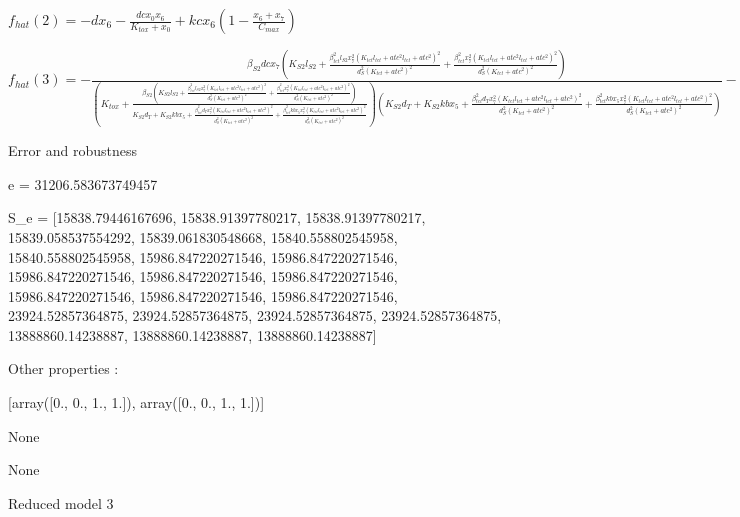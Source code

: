 $f_{hat}(2)=- d x_{6} - \frac{dc x_{0} x_{6}}{K_{tox} + x_{0}} + kc x_{6} \left(1 - \frac{x_{6} + x_{7}}{C_{max}}\right)$


$f_{hat}(3)=- \frac{\beta_{S2} dc x_{7} \left(K_{S2} l_{S2} + \frac{\beta_{tet}^{2} l_{S2} x_{7}^{2} \left(K_{tet} l_{tet} + atc^{2} l_{tet} + atc^{2}\right)^{2}}{d_{S}^{2} \left(K_{tet} + atc^{2}\right)^{2}} + \frac{\beta_{tet}^{2} x_{7}^{2} \left(K_{tet} l_{tet} + atc^{2} l_{tet} + atc^{2}\right)^{2}}{d_{S}^{2} \left(K_{tet} + atc^{2}\right)^{2}}\right)}{\left(K_{tox} + \frac{\beta_{S2} \left(K_{S2} l_{S2} + \frac{\beta_{tet}^{2} l_{S2} x_{7}^{2} \left(K_{tet} l_{tet} + atc^{2} l_{tet} + atc^{2}\right)^{2}}{d_{S}^{2} \left(K_{tet} + atc^{2}\right)^{2}} + \frac{\beta_{tet}^{2} x_{7}^{2} \left(K_{tet} l_{tet} + atc^{2} l_{tet} + atc^{2}\right)^{2}}{d_{S}^{2} \left(K_{tet} + atc^{2}\right)^{2}}\right)}{K_{S2} d_{T} + K_{S2} kb x_{5} + \frac{\beta_{tet}^{2} d_{T} x_{7}^{2} \left(K_{tet} l_{tet} + atc^{2} l_{tet} + atc^{2}\right)^{2}}{d_{S}^{2} \left(K_{tet} + atc^{2}\right)^{2}} + \frac{\beta_{tet}^{2} kb x_{5} x_{7}^{2} \left(K_{tet} l_{tet} + atc^{2} l_{tet} + atc^{2}\right)^{2}}{d_{S}^{2} \left(K_{tet} + atc^{2}\right)^{2}}}\right) \left(K_{S2} d_{T} + K_{S2} kb x_{5} + \frac{\beta_{tet}^{2} d_{T} x_{7}^{2} \left(K_{tet} l_{tet} + atc^{2} l_{tet} + atc^{2}\right)^{2}}{d_{S}^{2} \left(K_{tet} + atc^{2}\right)^{2}} + \frac{\beta_{tet}^{2} kb x_{5} x_{7}^{2} \left(K_{tet} l_{tet} + atc^{2} l_{tet} + atc^{2}\right)^{2}}{d_{S}^{2} \left(K_{tet} + atc^{2}\right)^{2}}\right)} - d x_{7} + kc x_{7} \left(1 - \frac{x_{6} + x_{7}}{C_{max}}\right)$



Error and robustness 


e = 31206.583673749457

S_e = [15838.79446167696, 15838.91397780217, 15838.91397780217, 15839.058537554292, 15839.061830548668, 15840.558802545958, 15840.558802545958, 15986.847220271546, 15986.847220271546, 15986.847220271546, 15986.847220271546, 15986.847220271546, 15986.847220271546, 15986.847220271546, 15986.847220271546, 23924.52857364875, 23924.52857364875, 23924.52857364875, 23924.52857364875, 13888860.14238887, 13888860.14238887, 13888860.14238887]

Other properties :


[array([0., 0., 1., 1.]), array([0., 0., 1., 1.])]

None

None

Reduced model 3


